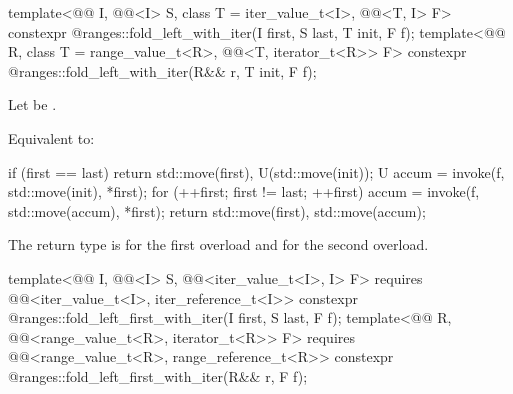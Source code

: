 %
\begin{itemdecl}
template<@@ I, @@<I> S, class T = iter_value_t<I>,
         @@<T, I> F>
  constexpr @\seebelow@ ranges::fold_left_with_iter(I first, S last, T init, F f);
template<@@ R, class T = range_value_t<R>,
         @@<T, iterator_t<R>> F>
  constexpr @\seebelow@ ranges::fold_left_with_iter(R&& r, T init, F f);
\end{itemdecl}

\begin{itemdescr}
\pnum
Let  be .

\pnum
\effects
Equivalent to:
\begin{codeblock}
if (first == last)
  return {std::move(first), U(std::move(init))};
U accum = invoke(f, std::move(init), *first);
for (++first; first != last; ++first)
  accum = invoke(f, std::move(accum), *first);
return {std::move(first), std::move(accum)};
\end{codeblock}

\pnum
\remarks
The return type is
 for the first overload and
for the second overload.
\end{itemdescr}

%
\begin{itemdecl}
template<@@ I, @@<I> S,
         @@<iter_value_t<I>, I> F>
  requires @@<iter_value_t<I>, iter_reference_t<I>>
  constexpr @\seebelow@ ranges::fold_left_first_with_iter(I first, S last, F f);
template<@@ R, @@<range_value_t<R>, iterator_t<R>> F>
  requires @@<range_value_t<R>, range_reference_t<R>>
  constexpr @\seebelow@ ranges::fold_left_first_with_iter(R&& r, F f);
\end{itemdecl}

